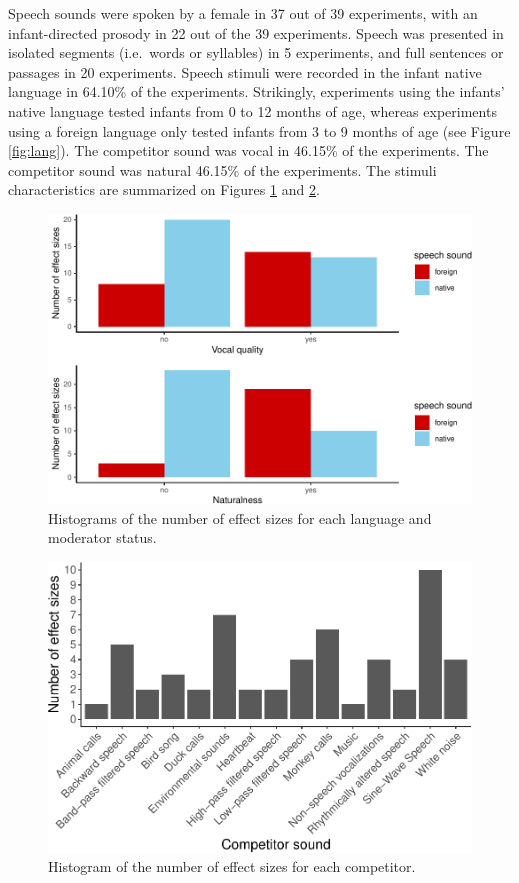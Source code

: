 \documentclass[
  english,
  man]{apa6}
\begin{document}
Speech sounds were spoken by a female in 37 out of 39 experiments, with an infant-directed prosody in 22 out of the 39 experiments. Speech was presented in isolated segments (i.e.~words or syllables) in 5 experiments, and full sentences or passages in 20 experiments. Speech stimuli were recorded in the infant native language in 64.10\% of the experiments. Strikingly, experiments using the infants' native language tested infants from 0 to 12 months of age, whereas experiments using a foreign language only tested infants from 3 to 9 months of age (see Figure \ref{fig:lang}).
The competitor sound was vocal in 46.15\% of the experiments. The competitor sound was natural 46.15\% of the experiments.
The stimuli characteristics are summarized on Figures \ref{fig:stimuli} and \ref{fig:competitors}.

\begin{figure}
\centering
\includegraphics{MA_speech_pref_files/figure-latex/stimuli-1.pdf}
\caption{\label{fig:stimuli}Histograms of the number of effect sizes for each language and moderator status.}
\end{figure}

\begin{figure}
\centering
\includegraphics{MA_speech_pref_files/figure-latex/competitors-1.pdf}
\caption{\label{fig:competitors}Histogram of the number of effect sizes for each competitor.}
\end{figure}
\end{document}
